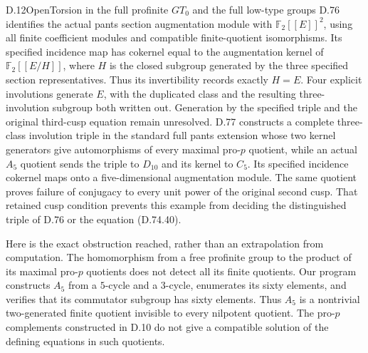 \begin{claim}{D.12}{Open}{Torsion in the full profinite $GT_0$ and the full low-type groups}
D.76 identifies the actual pants section augmentation module with $\mathbb F_2[[E]]^2$, using all finite coefficient modules and compatible finite-quotient isomorphisms. Its specified incidence map has cokernel equal to the augmentation kernel of $\mathbb F_2[[E/H]]$, where $H$ is the closed subgroup generated by the three specified section representatives. Thus its invertibility records exactly $H=E$. Four explicit involutions generate $E$, with the duplicated class and the resulting three-involution subgroup both written out. Generation by the specified triple and the original third-cusp equation remain unresolved.
D.77 constructs a complete three-class involution triple in the standard full pants extension whose two kernel generators give automorphisms of every maximal pro-$p$ quotient, while an actual $A_5$ quotient sends the triple to $D_{10}$ and its kernel to $C_5$. Its specified incidence cokernel maps onto a five-dimensional augmentation module. The same quotient proves failure of conjugacy to every unit power of the original second cusp. That retained cusp condition prevents this example from deciding the distinguished triple of D.76 or the equation (D.74.40).
\end{claim}
Here is the exact obstruction reached, rather than an extrapolation from computation. The homomorphism from a free profinite group to the product of its maximal pro-$p$ quotients does not detect all its finite quotients. Our program constructs $A_5$ from a $5$-cycle and a $3$-cycle, enumerates its sixty elements, and verifies that its commutator subgroup has sixty elements. Thus $A_5$ is a nontrivial two-generated finite quotient invisible to every nilpotent quotient. The pro-$p$ complements constructed in D.10 do not give a compatible solution of the defining equations in such quotients.

